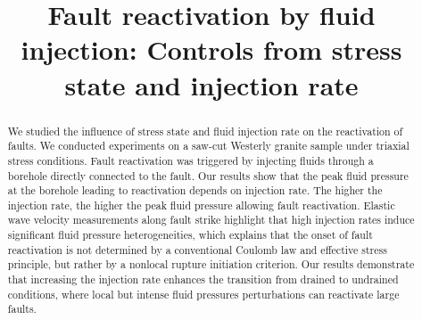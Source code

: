 \documentclass[grl]{agutex2arxiv}
\begin{document}
\title{Fault reactivation by fluid injection: Controls from stress state and injection rate}


 







\begin{abstract}
  We studied the influence of stress state and fluid injection rate on the reactivation of faults. We conducted experiments on a saw-cut Westerly granite sample under triaxial stress conditions. Fault reactivation was triggered by injecting fluids through a borehole directly connected to the fault. Our results show that the peak fluid pressure at the borehole leading to reactivation depends on injection rate. The higher the injection rate, the higher the peak fluid pressure allowing fault reactivation. Elastic wave velocity measurements along fault strike highlight that high injection rates induce significant fluid pressure heterogeneities, which explains that the onset of fault reactivation is not determined by a conventional Coulomb law and effective stress principle, but rather by a nonlocal rupture initiation criterion. Our results demonstrate that increasing the injection rate enhances the transition from drained to undrained conditions, where local but intense fluid pressures perturbations can reactivate large faults.

\end{abstract}
\end{document}
